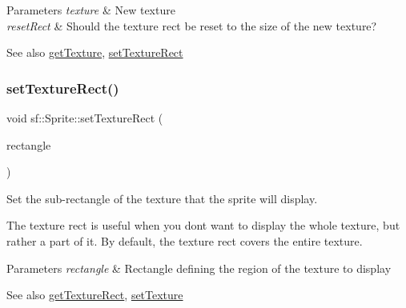 \begin{DoxyParams}{Parameters}
{\em texture} & New texture \\
\hline
{\em reset\+Rect} & Should the texture rect be reset to the size of the new texture?\\
\hline
\end{DoxyParams}
\begin{DoxySeeAlso}{See also}
\mbox{\hyperlink{classsf_1_1_sprite_a1a76155146c8ff37c4eb5a306b4e9ebe}{get\+Texture}}, \mbox{\hyperlink{classsf_1_1_sprite_a3fefec419a4e6a90c0fd54c793d82ec2}{set\+Texture\+Rect}} \begin{DoxyVerb}\end{DoxyVerb}
 
\end{DoxySeeAlso}
\mbox{\label{classsf_1_1_sprite_a3fefec419a4e6a90c0fd54c793d82ec2}} 
\subsubsection{\texorpdfstring{setTextureRect()}{setTextureRect()}}
{\footnotesize\ttfamily void sf\+::\+Sprite\+::set\+Texture\+Rect (\begin{DoxyParamCaption}\item[{const \mbox{\hyperlink{classsf_1_1_rect}{Int\+Rect}} \&}]{rectangle }\end{DoxyParamCaption})}



Set the sub-\/rectangle of the texture that the sprite will display. 

The texture rect is useful when you don\textquotesingle{}t want to display the whole texture, but rather a part of it. By default, the texture rect covers the entire texture.


\begin{DoxyParams}{Parameters}
{\em rectangle} & Rectangle defining the region of the texture to display\\
\hline
\end{DoxyParams}
\begin{DoxySeeAlso}{See also}
\mbox{\hyperlink{classsf_1_1_sprite_a3492896fe7b63f58ae022c5b8bec5c98}{get\+Texture\+Rect}}, \mbox{\hyperlink{classsf_1_1_sprite_a3729c88d88ac38c19317c18e87242560}{set\+Texture}} \begin{DoxyVerb}\end{DoxyVerb}
 
\end{DoxySeeAlso}
\mbox{\label{classsf_1_1_sprite_adc47a06b1f326ee3eb2dea65167c8b43}} 
